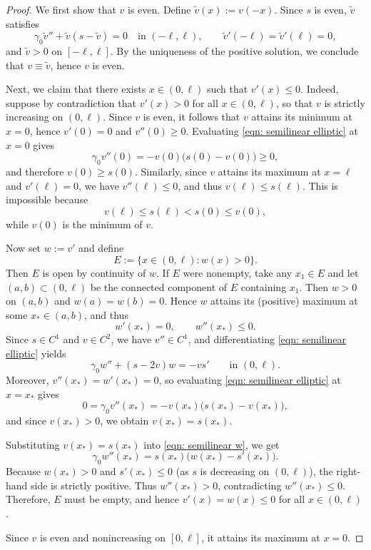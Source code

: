 \documentclass{article}
\begin{document}
\begin{proof}
We first show that $v$ is even. Define $\tilde v(x):=v(-x)$. Since $s$ is even, $\tilde v$ satisfies
\[
\gamma_0\tilde v''+\tilde v(s-\tilde v)=0 \quad\text{in }(-\ell,\ell),\qquad 
\tilde v'(-\ell)=\tilde v'(\ell)=0,
\]
and $\tilde v>0$ on $[-\ell,\ell]$. By the uniqueness of the positive solution, we conclude that
$v\equiv \tilde v$, hence $v$ is even.

Next, we claim that there exists $x\in(0,\ell)$ such that $v'(x)\le 0$.
Indeed, suppose by contradiction that $v'(x)>0$ for all $x\in(0,\ell)$, so that $v$ is strictly increasing on $(0,\ell)$.
Since $v$ is even, it follows that $v$ attains its minimum at $x=0$, hence $v'(0)=0$ and $v''(0)\ge 0$.
Evaluating \eqref{eqn: semilinear elliptic} at $x=0$ gives
\[
\gamma_0 v''(0)=-v(0)\bigl(s(0)-v(0)\bigr)\ge 0,
\]
and therefore $v(0)\ge s(0)$.
Similarly, since $v$ attains its maximum at $x=\ell$ and $v'(\ell)=0$, we have $v''(\ell)\le 0$, and thus
$v(\ell)\le s(\ell)$.
This is impossible because
\[
v(\ell)\le s(\ell)<s(0)\le v(0),
\]
while $v(0)$ is the minimum of $v$. 

Now set $w:=v'$ and define
$$
E:=\{x\in(0,\ell): w(x)>0\}.
$$
Then $E$ is open by continuity of $w$. If $E$ were nonempty, take any $x_1\in E$ and let $(a,b)\subset (0,\ell)$
be the connected component of $E$ containing $x_1$. Then $w>0$ on $(a,b)$ and $w(a)=w(b)=0$.
Hence $w$ attains its (positive) maximum at some $x_*\in(a,b)$, and thus
\[
w'(x_*)=0,\qquad w''(x_*)\le 0.
\]
Since $s\in C^1$ and $v\in C^2$, we have $v''\in C^1$, and differentiating \eqref{eqn: semilinear elliptic} yields
\begin{equation}\label{eqn: semilinear w}
\gamma_0 w''+(s-2v)w=-vs' \qquad \text{in }(0,\ell).
\end{equation}
Moreover, $v''(x_*)=w'(x_*)=0$, so evaluating \eqref{eqn: semilinear elliptic} at $x=x_*$ gives
\[
0=\gamma_0 v''(x_*)=-v(x_*)\bigl(s(x_*)-v(x_*)\bigr),
\]
and since $v(x_*)>0$, we obtain $v(x_*)=s(x_*)$.

Substituting $v(x_*)=s(x_*)$ into \eqref{eqn: semilinear w}, we get
\[
\gamma_0 w''(x_*)=s(x_*)\bigl(w(x_*)-s'(x_*)\bigr).
\]
Because $w(x_*)>0$ and $s'(x_*)\le 0$ (as $s$ is decreasing on $(0,\ell)$), the right-hand side is strictly positive.
Thus $w''(x_*)>0$, contradicting $w''(x_*)\le 0$.
Therefore, $E$ must be empty, and hence $v'(x)=w(x)\le 0$ for all $x\in(0,\ell)$.

Since $v$ is even and nonincreasing on $[0,\ell]$, it attains its maximum at $x=0$.
\end{proof}
\end{document}
